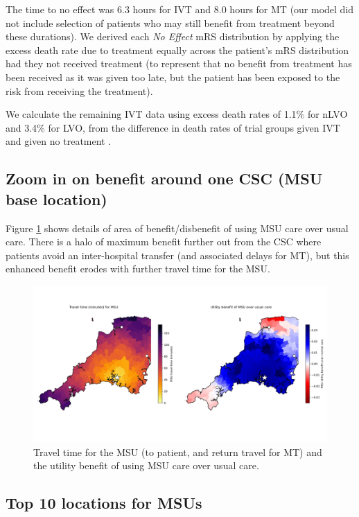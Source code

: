 The time to no effect was 6.3 hours for IVT \cite{emberson_effect_2014} and 8.0 hours for MT \cite{ fransen_time_2016} (our model did not include selection of patients who may still benefit from treatment beyond these durations). We derived each \textit{No Effect} mRS distribution by applying the excess death rate due to treatment equally across the patient’s mRS distribution had they not received treatment (to represent that no benefit from treatment has been received as it was given too late, but the patient has been exposed to the risk from receiving the treatment).

We calculate the remaining IVT data using excess death rates of 1.1\% for nLVO and 3.4\% for LVO, from the difference in death rates of trial groups given IVT and given no treatment \cite{emberson_effect_2014}.

\subsection{Zoom in on benefit around one CSC (MSU base location)}

Figure \ref{fig:map_zoom} shows details of area of benefit/disbenefit of using MSU care over usual care. There is a halo of maximum benefit further out from the CSC where patients avoid an inter-hospital transfer (and associated delays for MT), but this enhanced benefit erodes with further travel time for the MSU.

\begin{figure}[h!]
    \centering
    \includegraphics[width=1.0\linewidth]{images/map_zoom.jpg}
    \caption{Travel time for the MSU (to patient, and return travel for MT) and the utility benefit of using MSU care over usual care.}
    \label{fig:map_zoom}
\end{figure}

\subsection{Top 10 locations for MSUs}

